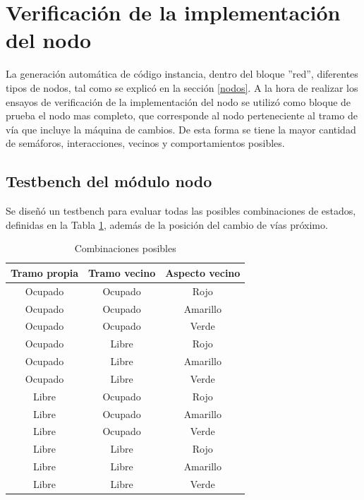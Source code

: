 \section{Verificación de la implementación del nodo}

	La generación automática de código instancia, dentro del bloque ''red'', diferentes tipos de nodos, tal como se explicó en la sección \ref{nodos}. A la hora de realizar los ensayos de verificación de la implementación del nodo se utilizó como bloque de prueba el nodo mas completo, que corresponde al nodo perteneciente al tramo de vía que incluye la máquina de cambios. De esta forma se tiene la mayor cantidad de semáforos, interacciones, vecinos y comportamientos posibles.
	
	\subsection{Testbench del módulo nodo}
			
			Se diseñó un testbench para evaluar todas las posibles combinaciones de estados, definidas en la Tabla \ref{tabla_nodos}, además de la posición del cambio de vías próximo.
					
			\begin{table}[!hbt]
			\renewcommand{\arraystretch}{1.3}
			\caption{Combinaciones posibles}
			\label{tabla_nodos}
			\centering
			\begin{tabular}{ c  c  c }
			\hline
			Tramo propia & Tramo vecino & Aspecto vecino \\	
			\hline
			Ocupado & Ocupado & Rojo  \\
			Ocupado & Ocupado & Amarillo  \\
			Ocupado & Ocupado & Verde  \\	
			Ocupado & Libre & Rojo  \\
			Ocupado & Libre & Amarillo  \\
			Ocupado & Libre & Verde  \\	
			Libre & Ocupado & Rojo  \\
			Libre & Ocupado & Amarillo  \\
			Libre & Ocupado & Verde  \\	
			Libre & Libre & Rojo  \\
			Libre & Libre & Amarillo  \\
			Libre & Libre & Verde  \\	
			\end{tabular}
			\end{table}	
	
